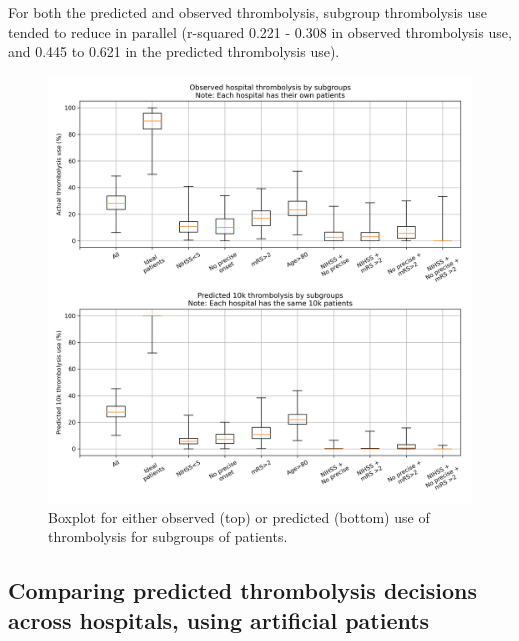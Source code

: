 For both the predicted and observed thrombolysis, subgroup thrombolysis use tended to reduce in parallel (r-squared 0.221 - 0.308 in observed thrombolysis use, and 0.445 to 0.621 in the predicted thrombolysis use).

\begin{figure}
\centering
\includegraphics[width=1\textwidth]{./images/15a_actual_vs_modelled_subgroup_violin}
\caption{Boxplot for either observed (top) or predicted (bottom) use of thrombolysis for subgroups of patients.}
\label{fig:results_boxplot}
\end{figure}


\subsection{Comparing predicted thrombolysis decisions across hospitals, using artificial patients}

